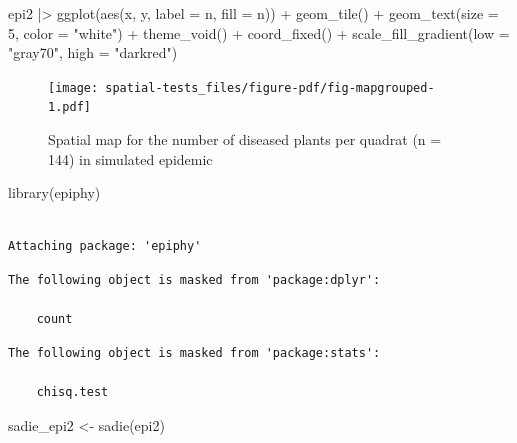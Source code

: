 \documentclass[
  letterpaper,
]{book}
\newenvironment{Shaded}{\begin{snugshade}}{\end{snugshade}}
\newcommand{\AttributeTok}[1]{\textcolor[rgb]{0.40,0.45,0.13}{#1}}
\newcommand{\DecValTok}[1]{\textcolor[rgb]{0.68,0.00,0.00}{#1}}
\newcommand{\FunctionTok}[1]{\textcolor[rgb]{0.28,0.35,0.67}{#1}}
\newcommand{\NormalTok}[1]{\textcolor[rgb]{0.00,0.23,0.31}{#1}}
\newcommand{\OtherTok}[1]{\textcolor[rgb]{0.00,0.23,0.31}{#1}}
\newcommand{\SpecialCharTok}[1]{\textcolor[rgb]{0.37,0.37,0.37}{#1}}
\newcommand{\StringTok}[1]{\textcolor[rgb]{0.13,0.47,0.30}{#1}}
\begin{document}
\begin{Shaded}
\begin{Highlighting}[]
\NormalTok{epi2 }\SpecialCharTok{|\textgreater{}}
  \FunctionTok{ggplot}\NormalTok{(}\FunctionTok{aes}\NormalTok{(x, y, }\AttributeTok{label =}\NormalTok{ n, }\AttributeTok{fill =}\NormalTok{ n)) }\SpecialCharTok{+}
  \FunctionTok{geom\_tile}\NormalTok{() }\SpecialCharTok{+}
  \FunctionTok{geom\_text}\NormalTok{(}\AttributeTok{size =} \DecValTok{5}\NormalTok{, }\AttributeTok{color =} \StringTok{"white"}\NormalTok{) }\SpecialCharTok{+}
  \FunctionTok{theme\_void}\NormalTok{() }\SpecialCharTok{+}
  \FunctionTok{coord\_fixed}\NormalTok{() }\SpecialCharTok{+}
  \FunctionTok{scale\_fill\_gradient}\NormalTok{(}\AttributeTok{low =} \StringTok{"gray70"}\NormalTok{, }\AttributeTok{high =} \StringTok{"darkred"}\NormalTok{)}
\end{Highlighting}
\end{Shaded}

\begin{figure}[H]

{\centering \texttt{[image: spatial-tests\_files/figure-pdf/fig-mapgrouped-1.pdf]}

}

\caption{\label{fig-mapgrouped}Spatial map for the number of diseased
plants per quadrat (n = 144) in simulated epidemic}

\end{figure}

\begin{Shaded}
\begin{Highlighting}[]
\FunctionTok{library}\NormalTok{(epiphy)}
\end{Highlighting}
\end{Shaded}

\begin{verbatim}

Attaching package: 'epiphy'
\end{verbatim}

\begin{verbatim}
The following object is masked from 'package:dplyr':

    count
\end{verbatim}

\begin{verbatim}
The following object is masked from 'package:stats':

    chisq.test
\end{verbatim}

\begin{Shaded}
\begin{Highlighting}[]
\NormalTok{sadie\_epi2 }\OtherTok{\textless{}{-}} \FunctionTok{sadie}\NormalTok{(epi2)}
\end{Highlighting}
\end{Shaded}
\end{document}
